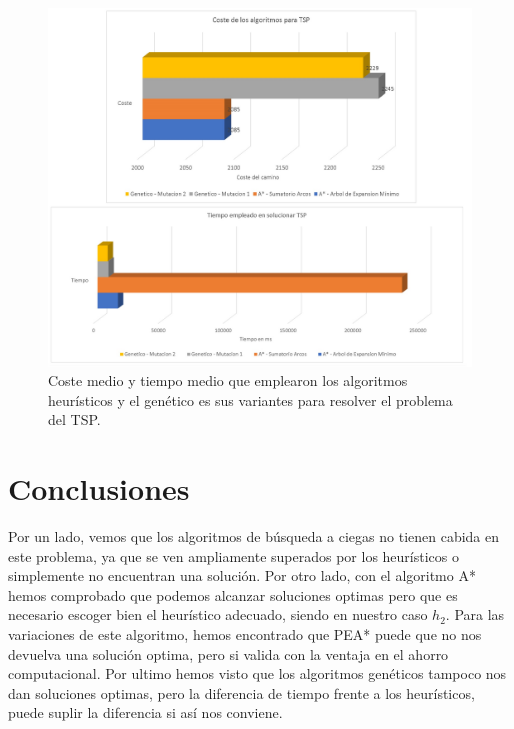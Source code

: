 \documentclass[runningheads]{llncs}
\begin{document}
\begin{figure}
	\centering
	\includegraphics[width=\textwidth]{ejercicio7_3.jpg}
	\caption{Coste medio y tiempo medio que emplearon los algoritmos heurísticos y el genético es sus variantes para resolver el problema del TSP.} 
	\label{figura_TSP}
\end{figure}

\section{Conclusiones}\label{seccion_conclusion}

Por un lado, vemos que los algoritmos de búsqueda a ciegas no tienen cabida en este problema, ya que se ven ampliamente superados por los heurísticos o simplemente no encuentran una solución.
Por otro lado, con el algoritmo A* hemos comprobado que podemos alcanzar soluciones optimas pero que es necesario escoger bien el heurístico adecuado, siendo en nuestro caso $ h_2 $. Para las variaciones de este algoritmo, hemos encontrado que PEA* puede que no nos devuelva una solución optima, pero si valida con la ventaja en el ahorro computacional.
Por ultimo hemos visto que los algoritmos genéticos tampoco nos dan soluciones optimas, pero la diferencia de tiempo frente a los heurísticos, puede suplir la diferencia si así nos conviene. 
\end{document}
